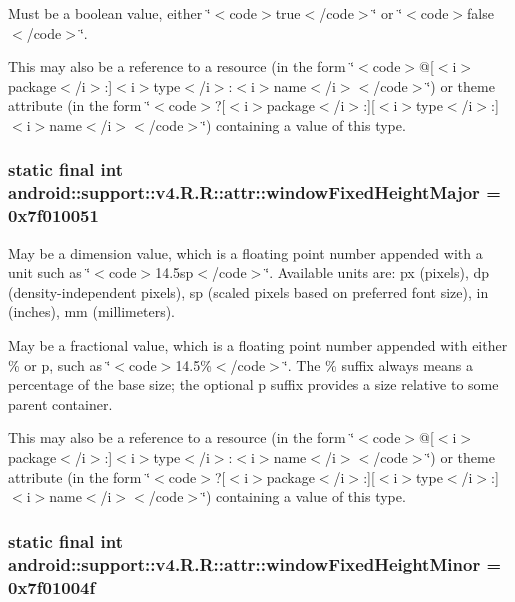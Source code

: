 Must be a boolean value, either \char`\"{}$<$code$>$true$<$/code$>$\char`\"{} or \char`\"{}$<$code$>$false$<$/code$>$\char`\"{}. 

This may also be a reference to a resource (in the form \char`\"{}$<$code$>$@\mbox{[}$<$i$>$package$<$/i$>$:\mbox{]}$<$i$>$type$<$/i$>$:$<$i$>$name$<$/i$>$$<$/code$>$\char`\"{}) or theme attribute (in the form \char`\"{}$<$code$>$?\mbox{[}$<$i$>$package$<$/i$>$:\mbox{]}\mbox{[}$<$i$>$type$<$/i$>$:\mbox{]}$<$i$>$name$<$/i$>$$<$/code$>$\char`\"{}) containing a value of this type. \hypertarget{classandroid_1_1support_1_1v4_1_1_r_1_1attr_747d79226b180952cadf839f81936a2a}{
\subsubsection[{windowFixedHeightMajor}]{\setlength{\rightskip}{0pt plus 5cm}static final int android::support::v4.R.R::attr::windowFixedHeightMajor = 0x7f010051}}
\label{classandroid_1_1support_1_1v4_1_1_r_1_1attr_747d79226b180952cadf839f81936a2a}


May be a dimension value, which is a floating point number appended with a unit such as \char`\"{}$<$code$>$14.5sp$<$/code$>$\char`\"{}. Available units are: px (pixels), dp (density-independent pixels), sp (scaled pixels based on preferred font size), in (inches), mm (millimeters). 

May be a fractional value, which is a floating point number appended with either \% or p, such as \char`\"{}$<$code$>$14.5\%$<$/code$>$\char`\"{}. The \% suffix always means a percentage of the base size; the optional p suffix provides a size relative to some parent container. 

This may also be a reference to a resource (in the form \char`\"{}$<$code$>$@\mbox{[}$<$i$>$package$<$/i$>$:\mbox{]}$<$i$>$type$<$/i$>$:$<$i$>$name$<$/i$>$$<$/code$>$\char`\"{}) or theme attribute (in the form \char`\"{}$<$code$>$?\mbox{[}$<$i$>$package$<$/i$>$:\mbox{]}\mbox{[}$<$i$>$type$<$/i$>$:\mbox{]}$<$i$>$name$<$/i$>$$<$/code$>$\char`\"{}) containing a value of this type. \hypertarget{classandroid_1_1support_1_1v4_1_1_r_1_1attr_07e64c320b914757f635892414aaadec}{
\subsubsection[{windowFixedHeightMinor}]{\setlength{\rightskip}{0pt plus 5cm}static final int android::support::v4.R.R::attr::windowFixedHeightMinor = 0x7f01004f}}
\label{classandroid_1_1support_1_1v4_1_1_r_1_1attr_07e64c320b914757f635892414aaadec}


